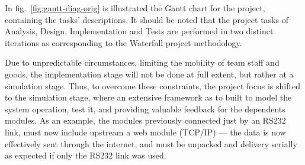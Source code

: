 In fig.~\ref{fig:gantt-diag-orig} is illustrated the Gantt chart for the project, containing the tasks' descriptions. It should be noted
that the project tasks of Analysis, Design, Implementation and Tests are
performed in two distinct iterations as corresponding to the Waterfall project
methodology.

Due to unpredictable circumstances, limiting the mobility of team
staff and goods, the implementation stage will not be done at full extent, but
rather at a simulation stage. Thus, to overcome these constraints, the project
focus is shifted to the simulation stage, where an extensive framework as to
built to model the system operation, test it, and providing valuable feedback
for the dependents modules. As an example, the modules previously connected just
by an RS232 link, must now include upstream a web module (TCP/IP) --- the data
is now effectively sent through the internet, and must be unpacked and delivery
serially as expected if only the RS232 link was used.

